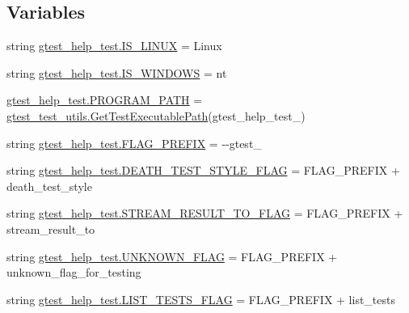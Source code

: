 \subsection*{Variables}
\begin{DoxyCompactItemize}
\item 
string \mbox{\hyperlink{namespacegtest__help__test_ae61a149d50be253176a139fbe6712582}{gtest\+\_\+help\+\_\+test.\+I\+S\+\_\+\+L\+I\+N\+UX}} = \textquotesingle{}Linux\textquotesingle{}
\item 
string \mbox{\hyperlink{namespacegtest__help__test_a0f8d4b00fc83b1e72bbb5eca5f3bc4d7}{gtest\+\_\+help\+\_\+test.\+I\+S\+\_\+\+W\+I\+N\+D\+O\+WS}} = \textquotesingle{}nt\textquotesingle{}
\item 
\mbox{\hyperlink{namespacegtest__help__test_a52878eacdd3a1534fa4743e7d134066c}{gtest\+\_\+help\+\_\+test.\+P\+R\+O\+G\+R\+A\+M\+\_\+\+P\+A\+TH}} = \mbox{\hyperlink{namespacegtest__test__utils_a89ed3717984a80ffbb7a9c92f71b86a2}{gtest\+\_\+test\+\_\+utils.\+Get\+Test\+Executable\+Path}}(\textquotesingle{}gtest\+\_\+help\+\_\+test\+\_\+\textquotesingle{})
\item 
string \mbox{\hyperlink{namespacegtest__help__test_a9e357a76dd993057c826ec411c9a4b3c}{gtest\+\_\+help\+\_\+test.\+F\+L\+A\+G\+\_\+\+P\+R\+E\+F\+IX}} = \textquotesingle{}-\/-\/gtest\+\_\+\textquotesingle{}
\item 
string \mbox{\hyperlink{namespacegtest__help__test_a322bbb8bf27d7701c76fb5704a1fda1f}{gtest\+\_\+help\+\_\+test.\+D\+E\+A\+T\+H\+\_\+\+T\+E\+S\+T\+\_\+\+S\+T\+Y\+L\+E\+\_\+\+F\+L\+AG}} = F\+L\+A\+G\+\_\+\+P\+R\+E\+F\+IX + \textquotesingle{}death\+\_\+test\+\_\+style\textquotesingle{}
\item 
string \mbox{\hyperlink{namespacegtest__help__test_a06d67cce3cb57c484c169d1dbe4afd6c}{gtest\+\_\+help\+\_\+test.\+S\+T\+R\+E\+A\+M\+\_\+\+R\+E\+S\+U\+L\+T\+\_\+\+T\+O\+\_\+\+F\+L\+AG}} = F\+L\+A\+G\+\_\+\+P\+R\+E\+F\+IX + \textquotesingle{}stream\+\_\+result\+\_\+to\textquotesingle{}
\item 
string \mbox{\hyperlink{namespacegtest__help__test_a400934cf13530098af31e2a65f1a8d84}{gtest\+\_\+help\+\_\+test.\+U\+N\+K\+N\+O\+W\+N\+\_\+\+F\+L\+AG}} = F\+L\+A\+G\+\_\+\+P\+R\+E\+F\+IX + \textquotesingle{}unknown\+\_\+flag\+\_\+for\+\_\+testing\textquotesingle{}
\item 
string \mbox{\hyperlink{namespacegtest__help__test_a558dea5edfd6fdb48112401b257f5aea}{gtest\+\_\+help\+\_\+test.\+L\+I\+S\+T\+\_\+\+T\+E\+S\+T\+S\+\_\+\+F\+L\+AG}} = F\+L\+A\+G\+\_\+\+P\+R\+E\+F\+IX + \textquotesingle{}list\+\_\+tests\textquotesingle{}

\end{DoxyCompactItemize}
